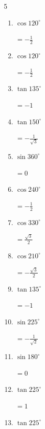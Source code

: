 \begin{multicols}{5}
\begin{enumerate}
        $\displaystyle =\frac{1}{\sqrt{2}}$

  \item $\displaystyle \cos{120^\circ}$

        $\displaystyle =-\frac{1}{2}$

  \item $\displaystyle \cos{120^\circ}$

        $\displaystyle =-\frac{1}{2}$

  \item $\displaystyle \tan{135^\circ}$

        $\displaystyle =-1$

  \item $\displaystyle \tan{150^\circ}$

        $\displaystyle =-\frac{1}{\sqrt{3}}$

  \item $\displaystyle \sin{360^\circ}$

        $\displaystyle =0$

  \item $\displaystyle \cos{240^\circ}$

        $\displaystyle =-\frac{1}{2}$

  \item $\displaystyle \cos{330^\circ}$

        $\displaystyle =\frac{\sqrt{3}}{2}$

  \item $\displaystyle \cos{210^\circ}$

        $\displaystyle =-\frac{\sqrt{3}}{2}$

  \item $\displaystyle \tan{135^\circ}$

        $\displaystyle =-1$

  \item $\displaystyle \sin{225^\circ}$

        $\displaystyle =-\frac{1}{\sqrt{2}}$

  \item $\displaystyle \sin{180^\circ}$

        $\displaystyle =0$

  \item $\displaystyle \tan{225^\circ}$

        $\displaystyle =1$

\columnbreak %

  \item $\displaystyle \tan{225^\circ}$


\end{enumerate}
\end{multicols}

